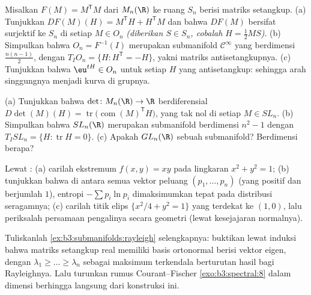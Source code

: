 \begin{exercise}[$\star\star$]\label{exo:b3:submanifolds:5}
Misalkan $F(M) = M^{\mathsf T}M$ dari $M_n(\R)$ ke ruang
$S_n$ berisi matriks setangkup.
(a) Tunjukkan $DF(M)(H) = M^{\mathsf T}H + H^{\mathsf T}M$ dan
bahwa $DF(M)$ bersifat surjektif ke $S_n$ di setiap $M \in O_n$
\emph{(diberikan $S \in S_n$, cobalah $H = \frac12MS$)}.
(b) Simpulkan bahwa $O_n = F^{-1}(I)$ merupakan submanifold
$\mathcal C^\infty$ yang  berdimensi
$\frac{n(n-1)}2$, dengan $T_IO_n = \{H : H^{\mathsf T} = -H\}$,
yakni matriks antisetangkupnya.
(c) Tunjukkan bahwa $\eu^{tH} \in O_n$ untuk setiap $H$ yang antisetangkup:
sehingga arah singgungnya  menjadi kurva di grupnya.
\end{exercise}

\begin{exercise}[$\star\star$]\label{exo:b3:submanifolds:6}
(a) Tunjukkan bahwa $\det \colon M_n(\R) \to \R$ berdiferensial
$D\det(M)(H) = \operatorname{tr}\bigl(\operatorname{com}(M)
^{\mathsf T}H\bigr)$, yang tak nol di setiap $M \in SL_n$.
(b) Simpulkan bahwa $SL_n(\R)$ merupakan submanifold berdimensi
$n^2 - 1$ dengan $T_ISL_n = \{H : \operatorname{tr}H = 0\}$.
(c) Apakah $GL_n(\R)$ sebuah submanifold? Berdimensi berapa?
\end{exercise}

\begin{exercise}[$\star\star$]\label{exo:b3:submanifolds:7}
Lewat :
(a) carilah ekstremum $f(x,y) = xy$ pada lingkaran $x^2 +
y^2 = 1$;
(b) tunjukkan bahwa di antara semua vektor peluang $(p_1, \dots,
p_n)$ (yang positif dan berjumlah $1$), entropi $-\sum
p_i\ln p_i$ dimaksimumkan tepat pada distribusi seragamnya;
(c) carilah titik elips $\{x^2/4 + y^2 = 1\}$ yang
terdekat ke $(1, 0)$, lalu periksalah persamaan pengalinya
secara geometri (lewat kesejajaran normalnya).
\end{exercise}

\begin{exercise}[$\star\star\star$]\label{exo:b3:submanifolds:8}
Tuliskanlah \cref{ex:b3:submanifolds:rayleigh} selengkapnya: buktikan
lewat induksi bahwa matriks setangkup real memiliki
basis ortonormal berisi vektor eigen, dengan
$\lambda_1 \geq \dots \geq \lambda_n$ sebagai maksimum
terkendala berturutan hasil bagi Rayleighnya. Lalu turunkan
rumus Courant--Fischer \cref{exo:b3:spectral:8} dalam
dimensi berhingga langsung dari konstruksi ini.
\end{exercise}

